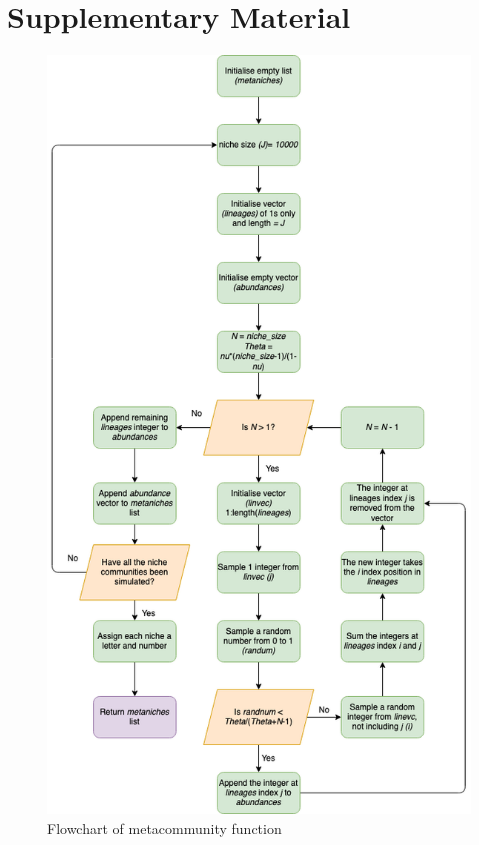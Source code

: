 
\chapter{Supplementary Material}


 \begin{figure}[h!]
\centering
  \includegraphics[scale=0.4]{metacommunity.png}
  \caption{Flowchart of metacommunity function}
  \label{fig:Flowchart}
\end{figure}

